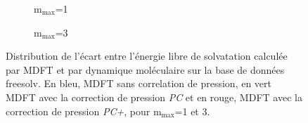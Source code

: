 \begin{figure}[H]
   \begin{subfigure}[b]{0.9\textwidth}
       \centering
       \caption{$\mathrm{m}_\mathrm{max}$=1}
       \label{fig:distrib_error_PC_PCPlus:mmax1}
    \end{subfigure}
   \begin{subfigure}[b]{0.9\textwidth}
       \centering
       \caption{$\mathrm{m}_\mathrm{max}$=3}
       \label{fig:distrib_error_PC_PCPlus:mmax3}
    \end{subfigure}
  \caption{Distribution de l'écart entre l'énergie libre de solvatation calculée par MDFT et par dynamique moléculaire sur la base de données freesolv. En bleu, MDFT sans correlation de pression, en vert MDFT avec la correction de pression \textit{PC} et en rouge, MDFT avec la correction de pression \textit{PC+}, pour $\mathrm{m}_\mathrm{max}$=1 et 3.}
  \label{fig:distrib_error_PC_PCPlus}
\end{figure}

